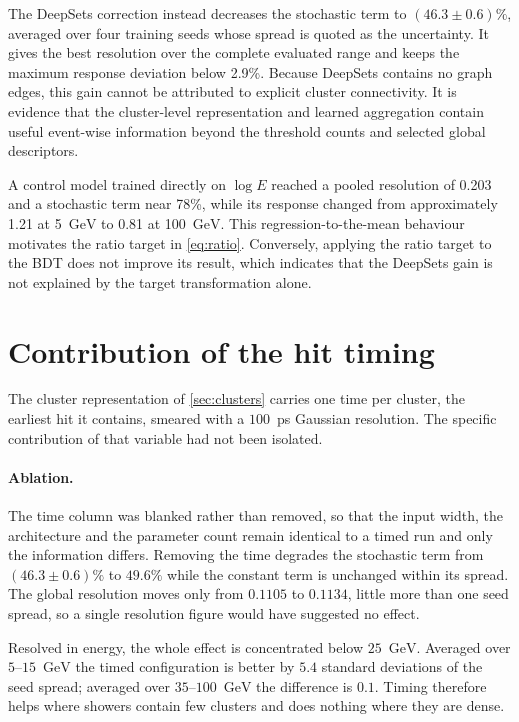 \documentclass[11pt,a4paper]{article}
\newcommand{\GeV}{\ensuremath{\mathrm{GeV}}}
\begin{document}
The DeepSets correction instead decreases the stochastic term to $(46.3\pm0.6)\%$,
averaged over four training seeds whose spread is quoted as the uncertainty.
It gives the best resolution over the complete evaluated range and keeps the maximum
response deviation below 2.9\%. Because DeepSets contains no graph edges, this gain
cannot be attributed to explicit cluster connectivity. It is evidence that the
cluster-level representation and learned aggregation contain useful event-wise
information beyond the threshold counts and selected global descriptors.

A control model trained directly on $\log E$ reached a pooled resolution of 0.203 and
a stochastic term near 78\%, while its response changed from approximately 1.21 at
5~\GeV{} to 0.81 at 100~\GeV{}. This regression-to-the-mean behaviour motivates the
ratio target in \cref{eq:ratio}. Conversely, applying the ratio target to the BDT does
not improve its result, which indicates that the DeepSets gain is not explained by the
target transformation alone.

\section{Contribution of the hit timing}
\label{sec:timing}

The cluster representation of \cref{sec:clusters} carries one time per cluster, the
earliest hit it contains, smeared with a $100$~ps Gaussian resolution. The specific
contribution of that variable had not been isolated.

\paragraph{Ablation.} The time column was blanked rather than removed, so that the
input width, the architecture and the parameter count remain identical to a timed run
and only the information differs. Removing the time degrades the stochastic term from
$(46.3\pm0.6)\%$ to $49.6\%$ while the constant term is unchanged within its spread.
The global resolution moves only from $0.1105$ to $0.1134$, little more than one seed
spread, so a single resolution figure would have suggested no effect.

Resolved in energy, the whole effect is concentrated below $25$~\GeV{}. Averaged over
$5$--$15$~\GeV{} the timed configuration is better by $5.4$ standard deviations of the
seed spread; averaged over $35$--$100$~\GeV{} the difference is $0.1$. Timing therefore
helps where showers contain few clusters and does nothing where they are dense.
\end{document}
